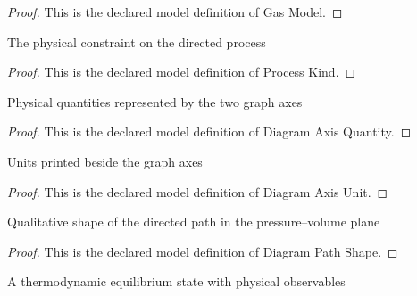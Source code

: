 \begin{proof}
  This is the declared model definition of Gas Model.
\end{proof}
\begin{definition}
  \label{def:physics:phyx-mini-0361:phyxminiproblems-problemphyxmini0361-processkind}
  The physical constraint on the directed process
\end{definition}
\begin{proof}
  This is the declared model definition of Process Kind.
\end{proof}
\begin{definition}
  \label{def:physics:phyx-mini-0361:phyxminiproblems-problemphyxmini0361-diagramaxisquantity}
  Physical quantities represented by the two graph axes
\end{definition}
\begin{proof}
  This is the declared model definition of Diagram Axis Quantity.
\end{proof}
\begin{definition}
  \label{def:physics:phyx-mini-0361:phyxminiproblems-problemphyxmini0361-diagramaxisunit}
  Units printed beside the graph axes
\end{definition}
\begin{proof}
  This is the declared model definition of Diagram Axis Unit.
\end{proof}
\begin{definition}
  \label{def:physics:phyx-mini-0361:phyxminiproblems-problemphyxmini0361-diagrampathshape}
  Qualitative shape of the directed path in the pressure--volume plane
\end{definition}
\begin{proof}
  This is the declared model definition of Diagram Path Shape.
\end{proof}
\begin{definition}
  \label{def:physics:phyx-mini-0361:phyxminiproblems-problemphyxmini0361-thermodynamicstate}
  A thermodynamic equilibrium state with physical observables
\end{definition}
